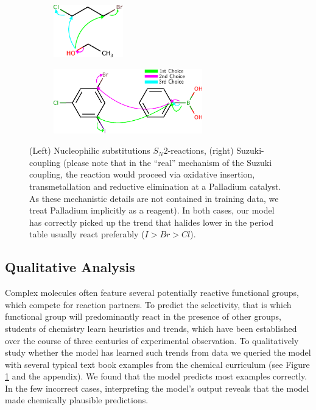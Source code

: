 
\begin{figure}[t]

    \centering
    \begin{subfigure}[b]{0.3\textwidth}
        \centering
        \includegraphics[height=0.9in]{imgs/textbook/reaction3}\\\vspace{0.1in}
    \end{subfigure}%
    \hspace{1cm}
     \begin{subfigure}[b]{0.5\textwidth}
        \centering
        \includegraphics[height=1.1in]{imgs/textbook/reaction7}
    \end{subfigure}
	\caption{(Left) Nucleophilic substitutions $S_N 2$-reactions, (right) Suzuki-coupling (please note that in the ``real'' mechanism of the Suzuki coupling, the reaction would proceed via oxidative insertion, transmetallation and reductive elimination at a Palladium catalyst. As these mechanistic details are not contained in training data, we treat Palladium implicitly as a reagent). 
    In both cases, our model has correctly picked up the trend that halides lower in the period table usually react preferably ($I>Br>Cl$). }
	\label{fig:qualitative}
\vspace{-0.5em}
\end{figure}



\subsection{Qualitative Analysis}

Complex molecules often feature several potentially reactive functional groups, which compete for reaction partners. 
To predict the selectivity, that is which functional group will predominantly react in the presence of other groups, 
students of chemistry learn heuristics and trends, 
which have been established over the course of three centuries of experimental observation.
To qualitatively study whether the model has learned such trends from data we queried the model with several typical text book examples from the chemical curriculum (see Figure \ref{fig:qualitative} and the appendix). 
We found that the model predicts most examples correctly. In the few incorrect cases, interpreting the model's output reveals that the model made chemically plausible predictions.

